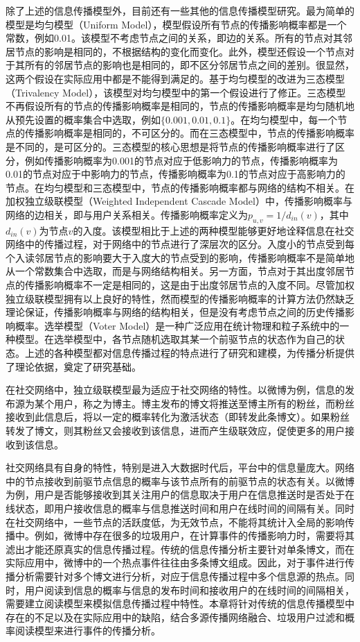 除了上述的信息传播模型外，目前还有一些其他的信息传播模型研究。最为简单的模型是均匀模型（Uniform Model），模型假设所有节点的传播影响概率都是一个常数，例如0.01。该模型不考虑节点之间的关系，即边的关系。所有的节点对其邻居节点的影响是相同的，不根据结构的变化而变化。此外，模型还假设一个节点对于其所有的邻居节点的影响也是相同的，即不区分邻居节点之间的差别。很显然，这两个假设在实际应用中都是不能得到满足的。基于均匀模型的改进为三态模型（Trivalency Model），该模型对均匀模型中的第一个假设进行了修正。三态模型不再假设所有的节点的传播影响概率是相同的，节点的传播影响概率是均匀随机地从预先设置的概率集合中选取，例如$\{0.001,0.01,0.1\}$。在均匀模型中，每一个节点的传播影响概率是相同的，不可区分的。而在三态模型中，节点的传播影响概率是不同的，是可区分的。三态模型的核心思想是将节点的传播影响概率进行了区分，例如传播影响概率为0.001的节点对应于低影响力的节点，传播影响概率为0.01的节点对应于中影响力的节点，传播影响概率为0.1的节点对应于高影响力的节点。在均匀模型和三态模型中，节点的传播影响概率都与网络的结构不相关。在加权独立级联模型（Weighted Independent Cascade Model）中，传播影响概率与网络的边相关，即与用户关系相关。传播影响概率定义为$p_{u,v}=1 / d_{in}\left(v\right)$，其中$d_{in}\left(v\right)$为节点$v$的入度。该模型相比于上述的两种模型能够更好地诠释信息在社交网络中的传播过程，对于网络中的节点进行了深层次的区分。入度小的节点受到每个入读邻居节点的影响要大于入度大的节点受到的影响，传播影响概率不是简单地从一个常数集合中选取，而是与网络结构相关。另一方面，节点对于其出度邻居节点的传播影响概率不一定是相同的，这是由于出度邻居节点的入度不同。尽管加权独立级联模型拥有以上良好的特性，然而模型的传播影响概率的计算方法仍然缺乏理论保证，传播影响概率与网络的结构相关，但是没有考虑节点之间的历史传播影响概率。选举模型（Voter Model）是一种广泛应用在统计物理和粒子系统中的一种模型。在选举模型中，各节点随机选取其某一个前驱节点的状态作为自己的状态。上述的各种模型都对信息传播过程的特点进行了研究和建模，为传播分析提供了理论依据，奠定了研究基础。

在社交网络中，独立级联模型最为适应于社交网络的特性。以微博为例，信息的发布源为某个用户，称之为博主。博主发布的博文将推送至博主所有的粉丝，而粉丝接收到此信息后，将以一定的概率转化为激活状态（即转发此条博文）。如果粉丝转发了博文，则其粉丝又会接收到该信息，进而产生级联效应，促使更多的用户接收到该信息。

社交网络具有自身的特性，特别是进入大数据时代后，平台中的信息量庞大。网络中的节点接收到前驱节点信息的概率与该节点所有的前驱节点的状态有关。以微博为例，用户是否能够接收到其关注用户的信息取决于用户在信息推送时是否处于在线状态，即用户接收信息的概率与信息推送时间和用户在线时间的间隔有关。同时在社交网络中，一些节点的活跃度低，为无效节点，不能将其统计入全局的影响传播中。例如，微博中存在很多的垃圾用户，在计算事件的传播影响力时，需要将其滤出才能还原真实的信息传播过程。传统的信息传播分析主要针对单条博文，而在实际应用中，微博中的一个热点事件往往由多条博文组成。因此，对于事件进行传播分析需要针对多个博文进行分析，对应于信息传播过程中多个信息源的热点。同时，用户阅读到信息的概率与信息的发布时间和接收用户的在线时间的间隔相关，需要建立阅读模型来模拟信息传播过程中特性。本章将针对传统的信息传播模型中存在的不足以及在实际应用中的缺陷，结合多源传播网络融合、垃圾用户过滤和概率阅读模型来进行事件的传播分析。

